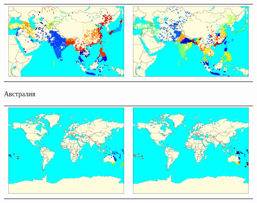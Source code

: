\documentclass[12pt, a4paper]{article}
\begin{document}
\begin{center}
			\begin{tabular}{c c}
				\includegraphics[width=8cm]{AS_k_means.pdf} &
				\includegraphics[width=8cm]{AS_k_medoids.pdf} \\
			\end{tabular}

			Австралия

			\begin{tabular}{c c}
				\includegraphics[width=8cm]{OC_k_means.pdf} &
				\includegraphics[width=8cm]{OC_k_medoids.pdf} \\
			\end{tabular}


\end{center}
\end{document}
